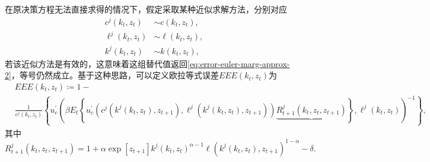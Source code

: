 在原决策方程无法直接求得的情况下，假定采取某种近似求解方法，分别对应
\begin{equation*}
  \begin{split}
    c^{j} \left( k_{t}, z_{t} \right) & \sim c \left( k_{t}, z_{t} \right), \\
    \ell^{j} \left( k_{t}, z_{t} \right) & \sim \ell \left( k_{t}, z_{t} \right), \\
    k^{j} \left( k_{t}, z_{t} \right) & \sim k \left( k_{t}, z_{t} \right),
  \end{split}
\end{equation*}
若该近似方法是有效的，这意味着这组替代值返回\eqref{eq:error-euler-marg-approx-2}，等号仍然成立。基于这种思路，可以定义欧拉等式误差$EEE(k_{t}, z_{t})$为
\begin{equation}
  \label{eq:error-euler-marg-approx-j}
  \begin{split}
  & EEE(k_{t}, z_{t}) \coloneqq 1- \\
  & \frac{1}{c^{j} \left( k_{t}, z_{t} \right)}
  \left\{
  u_{c}^{'}
  \left(
  \beta E_{t} \left\{ u_{c}^{'} \left(
  c^{j}
  \left( k^{j} \left(k_{t}, z_{t} \right), z_{t+1} \right)
  ,
  \ell^{j} \left( k^{j} \left(k_{t}, z_{t} \right), z_{t+1} \right)
  \right)
  \underbrace{
  R_{t+1}^{j} \left( k_{t}, z_{t}, z_{t+1} \right)
  }
  \right\},
  \ell^{j} \left( k_{t}, z_{t} \right)
  \right)^{-1}
  \right\},
\end{split}
\end{equation}
其中
\begin{equation*}
R_{t+1}^{j} \left( k_{t}, z_{t}, z_{t+1} \right) =
1 + \alpha \exp \left[
z_{t+1}
\right]
k^{j} \left(k_{t}, z_{t} \right)^{\alpha - 1}
\ell
\left(
k^{j} \left( k_{t}, z_{t} \right), z_{t+1}
\right)^{1 - \alpha} - \delta.
\end{equation*}

